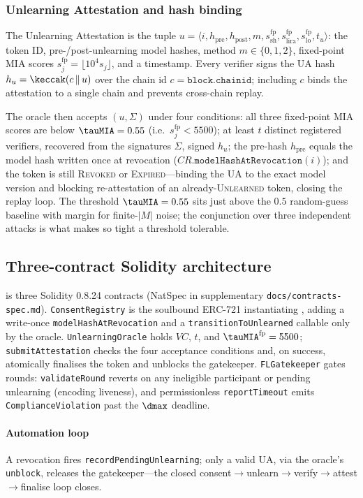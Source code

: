 \subsubsection{Unlearning Attestation and hash binding}

The Unlearning Attestation is the tuple
$u=\langle i, h_{\mathrm{pre}}, h_{\mathrm{post}}, m,
s_{\mathrm{sh}}^{\mathrm{fp}}, s_{\mathrm{lira}}^{\mathrm{fp}},
s_{\mathrm{lo}}^{\mathrm{fp}}, t_u\rangle$: the token ID, pre-/post-un\-learning
model hashes, method $m\in\{0,1,2\}$, fixed-point MIA scores
$s^{\mathrm{fp}}_j=\lfloor 10^4 s_j\rfloor$, and a timestamp. Every
verifier signs the UA hash $h_u=\keccak(c \,\|\, u)$ over the chain id
$c=\texttt{block.chainid}$; including $c$ binds the attestation to a
single chain and prevents cross-chain replay.

The oracle then accepts $(u,\Sigma)$ under four conditions: all three
fixed-point MIA scores are below $\tauMIA=0.55$ (i.e.\
$s^{\mathrm{fp}}_j<5500$); at least $t$ distinct registered verifiers,
recovered from the signatures $\Sigma$, signed $h_u$; the pre-hash
$h_{\mathrm{pre}}$ equals the model hash written once at revocation
($\mathit{CR}.\mathtt{modelHashAtRevocation}(i)$); and the token is
still \textsc{Revoked} or \textsc{Expired}---binding the UA to the
exact model version and blocking re-attestation of an
already-\textsc{Unlearned} token, closing the replay loop. The
threshold $\tauMIA=0.55$ sits just above the $0.5$ random-guess baseline
with margin for finite-$|M|$ noise; the conjunction over three
independent attacks is what makes so tight a threshold tolerable.

\subsection{Three-contract Solidity architecture}
\label{sec:framework-contracts}

\sysname is three Solidity 0.8.24 contracts (NatSpec in supplementary
\texttt{docs/contracts-spec.md}). \texttt{ConsentRegistry} is the
soulbound ERC-721 instantiating \clsm, adding a
write-once \texttt{modelHashAtRevocation} and a
\texttt{transitionToUnlearned} callable only by the oracle.
\texttt{UnlearningOracle} holds $\mathit{VC}$, $t$, and
$\tauMIA^{\mathrm{fp}}=5500$; \texttt{submitAttestation} checks the four
acceptance conditions and, on success, atomically finalises the token
and unblocks the gatekeeper. \texttt{FLGatekeeper} gates rounds:
\texttt{validateRound} reverts on any ineligible participant or pending
unlearning (encoding liveness), and permissionless \texttt{reportTimeout}
emits \texttt{ComplianceViolation} past the $\dmax$ deadline.

\paragraph{Automation loop} A revocation fires
\texttt{recordPendingUnlearning}; only a valid UA, via the oracle's
\texttt{unblock}, releases the gatekeeper---the closed
consent$\rightarrow$unlearn$\rightarrow$verify$\rightarrow$attest$\rightarrow$finalise
loop \sysname closes.
